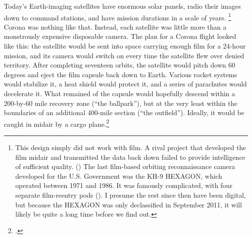 \documentclass[11pt]{memoir}
\begin{document}
Today's Earth-imaging satellites have enormous solar panels, radio their images down to command stations, and have mission durations in a scale of years. \footnote{This design simply did not work with film. A rival project that developed the film midair and transmitted the data back down failed to provide intelligence of sufficient quality. (\cite[p.~203-204]{brugioni_eyes_2010}) The last film-based orbiting reconnaissance camera developed for the U.S. Government was the KH-9 HEXAGON, which operated between 1971 and 1986. It was famously complicated, with four separate film-reentry pods (\cite{pressel_spy_2013}). I presume the rest since then have been digital, but because the HEXAGON was only declassified in September 2011, it will likely be quite a long time before we find out.} Corona was nothing like that. Instead, each satellite was little more than a monstrously expensive disposable camera. The plan for a Corona flight looked like this: the satellite would be sent into space carrying enough film for a 24-hour mission, and its camera would switch on every time the satellite flew over denied territory. After completing seventeen orbits, the satellite would pitch down 60 degrees and eject the film capsule back down to Earth. Various rocket systems would stabilize it, a heat shield would protect it, and a series of parachutes would decelerate it. What remained of the capsule would hopefully descend within a 200-by-60 mile recovery zone (``the ballpark''), but at the very least within the boundaries of an additional 400-mile section (``the outfield''). Ideally, it would be caught in midair by a cargo plane.\footcite[p.~56]{peebles_corona_1997}
\end{document}
